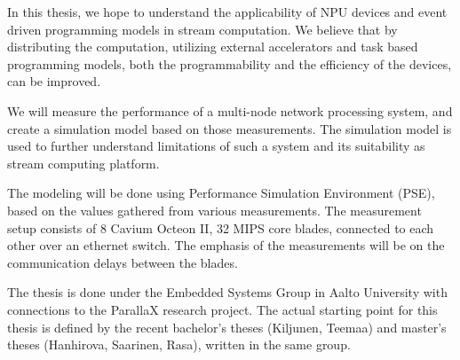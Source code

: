 In this thesis, we hope to understand the applicability of NPU devices and event driven programming models in stream computation. We believe that by distributing the computation, utilizing external accelerators and task based programming models, both the programmability and the efficiency of the devices, can be improved.

We will measure the performance of a multi-node network processing system, and create a simulation model based on those measurements. The simulation model is used to further understand limitations of such a system and its suitability as stream computing platform.

The modeling will be done using Performance Simulation Environment (PSE), based on the values gathered from various measurements. The measurement setup consists of 8 Cavium Octeon II, 32 MIPS core blades, connected to each other over an ethernet switch. The emphasis of the measurements will be on the communication delays between the blades.

The thesis is done under the Embedded Systems Group in Aalto University with connections to the ParallaX research project. The actual starting point for this thesis is defined by the recent bachelor's theses (Kiljunen, Teemaa) and master's theses (Hanhirova, Saarinen, Rasa), written in the same group.

